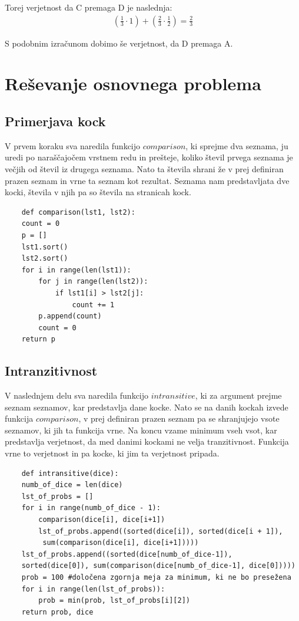 \documentclass[12pt,a4paper]{amsart}
\begin{document}
Torej verjetnost da C premaga D je naslednja:
\begin{align*}
    (\frac{1}{3}\cdot 1)+(\frac{2}{3}\cdot\frac{1}{2}) = \frac{2}{3}
\end{align*}

S podobnim izračunom dobimo še verjetnost, da D premaga A.


\section{Reševanje osnovnega problema}
\subsection{Primerjava kock}
V prvem koraku sva naredila funkcijo $comparison$, ki \linebreak
sprejme dva seznama, ju uredi po naraščajočem vrstnem redu in prešteje, koliko števil prvega seznama je večjih od števil iz drugega seznama. Nato ta števila shrani že 
v prej definiran prazen seznam in vrne ta seznam kot rezultat.
Seznama nam predstavljata dve kocki, števila v njih pa so števila na stranicah kock.
 \begin{verbatim}
    def comparison(lst1, lst2):
    count = 0
    p = []
    lst1.sort()
    lst2.sort()
    for i in range(len(lst1)):
        for j in range(len(lst2)):
            if lst1[i] > lst2[j]: 
                count += 1
        p.append(count) 
        count = 0 
    return p
 \end{verbatim}

 \subsection{Intranzitivnost}
 V naslednjem delu sva naredila funkcijo $intransitive$, ki za argument prejme seznam seznamov, kar predstavlja dane kocke.
 Nato se na danih kockah izvede funkcija $comparison$, v prej definiran prazen seznam pa se shranjujejo vsote seznamov, ki jih ta funkcija vrne.
 Na koncu vzame minimum vseh vsot, kar predstavlja verjetnost, da med danimi kockami ne velja tranzitivnost. Funkcija vrne to verjetnost in pa kocke, ki jim ta verjetnost pripada.
 \begin{verbatim}
    def intransitive(dice):
    numb_of_dice = len(dice)
    lst_of_probs = []
    for i in range(numb_of_dice - 1):
        comparison(dice[i], dice[i+1])
        lst_of_probs.append((sorted(dice[i]), sorted(dice[i + 1]),
         sum(comparison(dice[i], dice[i+1]))))
    lst_of_probs.append((sorted(dice[numb_of_dice-1]), 
    sorted(dice[0]), sum(comparison(dice[numb_of_dice-1], dice[0]))))
    prob = 100 #določena zgornja meja za minimum, ki ne bo presežena
    for i in range(len(lst_of_probs)):
        prob = min(prob, lst_of_probs[i][2])
    return prob, dice
 \end{verbatim}
\end{document}
